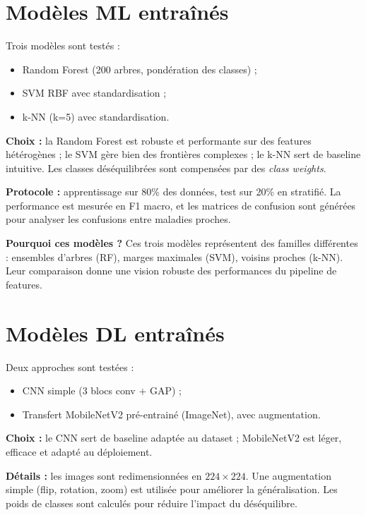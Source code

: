 \documentclass[12pt,a4paper]{article}
\begin{document}
\section{Mod\`eles ML entra\^in\'es}
Trois mod\`eles sont test\'es :
\begin{itemize}[leftmargin=*]
    \item Random Forest (200 arbres, pond\'eration des classes) ;
    \item SVM RBF avec standardisation ;
    \item k-NN (k=5) avec standardisation.
\end{itemize}

\textbf{Choix :} la Random Forest est robuste et performante sur des features h\'et\'erog\`enes ; le SVM g\`ere bien des fronti\`eres complexes ; le k-NN sert de baseline intuitive. Les classes d\'es\'equilibr\'ees sont compens\'ees par des \textit{class weights}.

\textbf{Protocole :} apprentissage sur 80\% des donn\'ees, test sur 20\% en stratifi\'e. La performance est mesur\'ee en F1 macro, et les matrices de confusion sont g\'en\'er\'ees pour analyser les confusions entre maladies proches.

\textbf{Pourquoi ces mod\`eles ?} Ces trois mod\`eles repr\'esentent des familles diff\'erentes : ensembles d'arbres (RF), marges maximales (SVM), voisins proches (k-NN). Leur comparaison donne une vision robuste des performances du pipeline de features.

\section{Mod\`eles DL entra\^in\'es}
Deux approches sont test\'ees :
\begin{itemize}[leftmargin=*]
    \item CNN simple (3 blocs conv + GAP) ;
    \item Transfert MobileNetV2 pr\'e-entrain\'e (ImageNet), avec augmentation.
\end{itemize}

\textbf{Choix :} le CNN sert de baseline adapt\'ee au dataset ; MobileNetV2 est l\'eger, efficace et adapt\'e au d\'eploiement.

\textbf{D\'etails :} les images sont redimensionn\'ees en $224\times224$. Une augmentation simple (flip, rotation, zoom) est utilis\'ee pour am\'eliorer la g\'en\'eralisation. Les poids de classes sont calcul\'es pour r\'eduire l'impact du d\'es\'equilibre.
\end{document}
